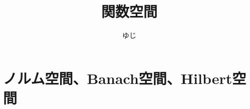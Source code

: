 \documentclass[uplatex]{jsarticle}
\title{関数空間}
\author{ゆじ}
\theoremstyle{definition}
\newcommand{\dfn}{:\overset{\mbox{{\scriptsize def}}}{=}}
\newcommand{\dl}{\partial}
\newcommand{\R}{\mathbb{R}}
\begin{document}
\maketitle




%
%
%
%
%
%







\section{ノルム空間、Banach空間、Hilbert空間}
\end{document}
